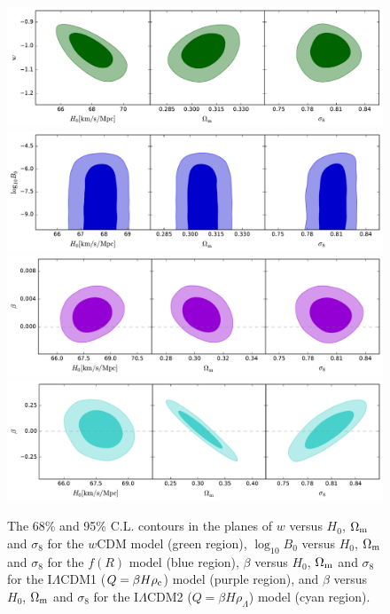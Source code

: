 \documentclass[aps,prd,nofootinbib,amsmath,amssymb,twocolumn,superscriptaddress,10pt]{revtex4}%
\begin{document}
\begin{figure}
\begin{center}
\includegraphics[scale=0.5, angle=0]{w-om-sig-h0-182.pdf}
\includegraphics[scale=0.5, angle=0]{b0-om-sig-h0-182.pdf}\\
\includegraphics[scale=0.5, angle=0]{beta1-om-sig-h0-182.pdf}
\includegraphics[scale=0.5, angle=0]{beta2-om-sig-h0-182.pdf}
\caption{The 68\% and 95\% C.L. contours in the planes of $w$ versus $H_{0}$, $\Omega_{\rm m}$ and $\sigma_{8}$ for the $w$CDM model {(green region)}, $\log_{10}B_{0}$ versus $H_{0}$, $\Omega_{\rm m}$ and $\sigma_{8}$ for the $f(R)$ model {(blue region)}, $\beta$ versus $H_{0}$, $\Omega_{\rm m}$ and $\sigma_{8}$ for the I$\Lambda$CDM1 ($Q=\beta H \rho_{\rm c}$) model (purple region), and $\beta$ versus $H_{0}$, $\Omega_{\rm m}$ and $\sigma_{8}$ for the I$\Lambda$CDM2 ($Q=\beta H\rho_{\Lambda}$) model (cyan region).}
\label{fig:all-model}
\end{center}
\end{figure}
\end{document}
